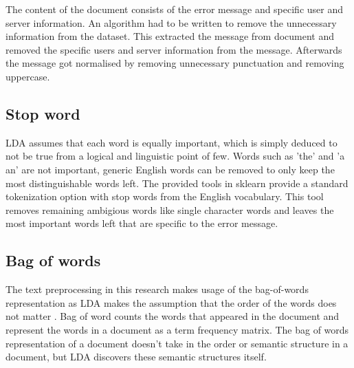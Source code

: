 The content of the document consists of the error message and specific user and server information. An algorithm had to be written to remove the unnecessary information from the dataset. This extracted the message from document and removed the specific users and server information from the message. Afterwards the message got normalised by removing unnecessary punctuation and removing uppercase.

\subsection{Stop word}\label{stop_words}
LDA assumes that each word is equally important, which is simply deduced to not be true from a logical and linguistic point of few. Words such as 'the' and 'a\\an' are not important, generic English words can be removed to only keep the most distinguishable words left. The provided tools in sklearn provide a standard tokenization option with stop words from the English vocabulary. This tool removes remaining ambigious words like single character words and leaves the most important words left that are specific to the error message.

\subsection{Bag of words} \label{bagow}
The text preprocessing in this research makes usage of the bag-of-words representation as LDA makes the assumption that the order of the words does not matter \cite{Blei2010}. Bag of word counts the words that appeared in the document and represent the words in a document as a term frequency matrix. The bag of words representation of a document doesn't take in the order or semantic structure in a document, but LDA discovers these semantic structures itself. 

